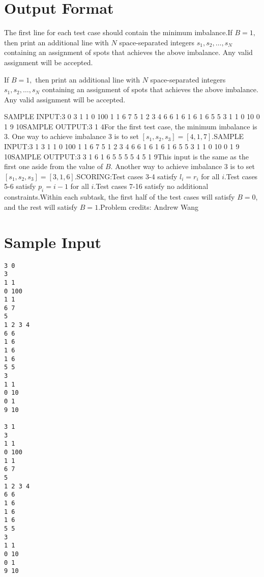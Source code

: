 \documentclass[12pt]{article}
\begin{document}
\section*{Output Format}
The first line for each test case should contain the minimum imbalance.If $B=1,$ then print an additional line with $N$ space-separated integers
$s_1,s_2,\ldots, s_N$ containing an assignment of spots that achieves the above
imbalance. Any valid assignment will be accepted.

If $B=1,$ then print an additional line with $N$ space-separated integers
$s_1,s_2,\ldots, s_N$ containing an assignment of spots that achieves the above
imbalance. Any valid assignment will be accepted.

SAMPLE INPUT:3 0
3
1 1
0 100
1 1
6 7
5
1 2 3 4
6 6
1 6
1 6
1 6
5 5
3
1 1
0 10
0 1
9 10SAMPLE OUTPUT:3
1
4For the first test case, the minimum imbalance is $3$. One way to achieve
imbalance $3$ is to set $[s_1,s_2,s_3]=[4,1,7]$.SAMPLE INPUT:3 1
3
1 1
0 100
1 1
6 7
5
1 2 3 4
6 6
1 6
1 6
1 6
5 5
3
1 1
0 10
0 1
9 10SAMPLE OUTPUT:3
3 1 6
1
6 5 5 5 5
4
5 1 9This input is the same as the first one aside from the value of $B$. Another way
to achieve imbalance $3$ is to set $[s_1,s_2,s_3]=[3,1,6]$.SCORING:Test cases 3-4 satisfy $l_i=r_i$ for all $i$.Test cases 5-6 satisfy $p_i=i-1$ for all $i$.Test cases 7-16 satisfy no additional constraints.Within each subtask, the first half of the test cases will satisfy $B=0$, and
the rest will satisfy $B=1$.Problem credits: Andrew Wang

\section*{Sample Input}
\begin{verbatim}
3 0
3
1 1
0 100
1 1
6 7
5
1 2 3 4
6 6
1 6
1 6
1 6
5 5
3
1 1
0 10
0 1
9 10

3 1
3
1 1
0 100
1 1
6 7
5
1 2 3 4
6 6
1 6
1 6
1 6
5 5
3
1 1
0 10
0 1
9 10
\end{verbatim}
\end{document}
